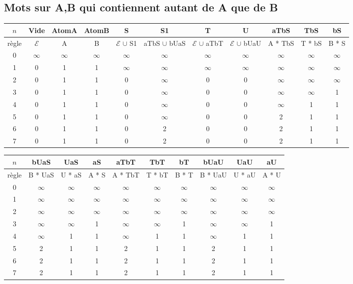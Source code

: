 \documentclass[a4paper, titlepage]{article}
\begin{document}
\subsection{Mots sur A,B qui contiennent autant de A que de B}

\begin{table}[!hbt]
\centering
\small
\setlength\tabcolsep{2pt}
\begin{tabular}{|c|cccccccccc|}
\hline $n$ & Vide & AtomA & AtomB & S & S1 & T & U & aTbS & TbS & bS\\
\hline
\hline règle & $\mathcal{E}$ & A & B &  $\mathcal{E}$ $\cup$ S1 &
aTbS $\cup$ bUaS &  $\mathcal{E}$ $\cup$ aTbT &  $\mathcal{E}$ $\cup$
bUaU & A * TbS & T * bS & B * S  \\
\hline
\hline
0 & $\infty$ &  $\infty$ & $\infty$ & $\infty$ & $\infty$ & $\infty$ &
$\infty$ & $\infty$ & $\infty$  & $\infty$  \\
1 & 0 & 1 & 1 & $\infty$ & $\infty$ & $\infty$ &
$\infty$ & $\infty$ & $\infty$  & $\infty$  \\
2 & 0 & 1 & 1 & 0 & $\infty$ & 0 &
0 & $\infty$ & $\infty$  & $\infty$  \\
3 & 0 & 1 & 1 & 0 & $\infty$ & 0 & 0 & $\infty$ & $\infty$  & 1  \\
4 & 0 & 1 & 1 & 0 & $\infty$ & 0 & 0 & $\infty$ & 1 & 1  \\
5 & 0 & 1 & 1 & 0 & $\infty$ & 0 & 0 & 2 & 1 & 1  \\
6 & 0 & 1 & 1 & 0 & 2 & 0 & 0 & 2 & 1 & 1  \\
7 & 0 & 1 & 1 & 0 & 2 & 0 & 0 & 2 & 1 & 1  \\

\hline
\end{tabular}

\vspace{1cm}

\begin{tabular}{|c|ccccccccc|}
\hline $n$ & bUaS & UaS & aS & aTbT & TbT & bT & bUaU & UaU & aU \\
\hline
\hline règle & B * UaS  & U * aS & A * S & A * TbT & T * bT & B * T & B * UaU & U
* aU & A * U\\
\hline
\hline
0 & $\infty$ &  $\infty$ & $\infty$ & $\infty$ & $\infty$ & $\infty$ &
$\infty$  & $\infty$ & $\infty$ \\
1 & $\infty$ &  $\infty$ & $\infty$ & $\infty$ & $\infty$ & $\infty$ &
$\infty$  & $\infty$ & $\infty$ \\
2 & $\infty$ &  $\infty$ & $\infty$ & $\infty$ & $\infty$ & $\infty$ &
$\infty$  & $\infty$ & $\infty$ \\
3 & $\infty$ &  $\infty$ & 1 & $\infty$ & $\infty$ & 1 &
$\infty$  & $\infty$ & 1 \\
4 & $\infty$ & 1 & 1 & $\infty$ & 1  & 1 &
$\infty$  & 1 & 1 \\
5 & 2 & 1 & 1 & 2 & 1 & 1 & 2  & 1 & 1 \\
6 & 2 & 1 & 1 & 2 & 1 & 1 & 2  & 1 & 1 \\
7 & 2 & 1 & 1 & 2 & 1 & 1 & 2  & 1 & 1 \\

\hline
\end{tabular}
\end{table}
\end{document}
